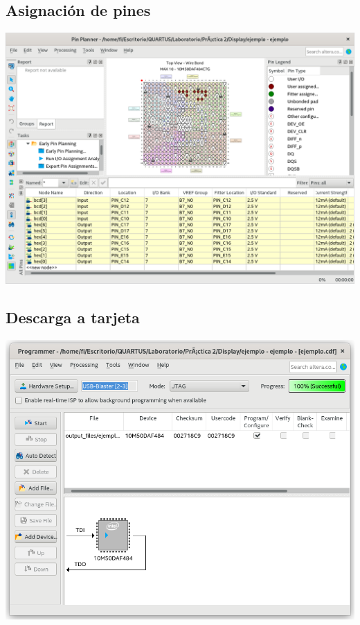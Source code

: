 \documentclass[10pt,a4paper]{article}
\begin{document}
	\subsection{Asignación de pines}
	\begin{center}
		\includegraphics[scale=0.35]{Pines.png}
	\end{center}
	
	\subsection{Descarga a tarjeta}
	\begin{center}
		\includegraphics[scale=0.35]{Descarga.png}
	\end{center}
	
\end{document}
